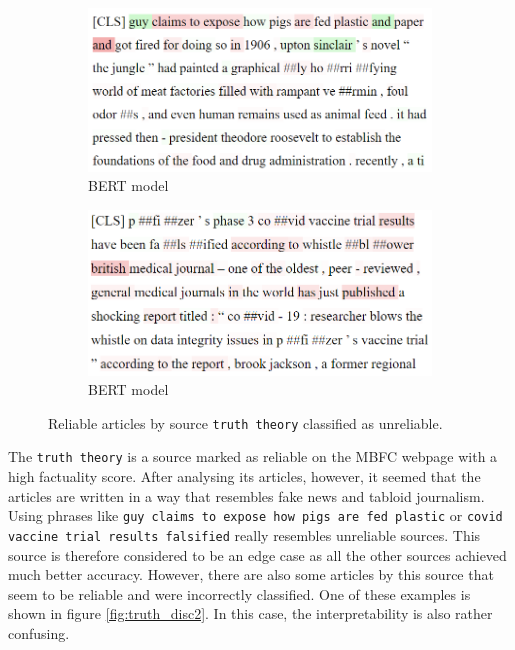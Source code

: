 \begin{figure}[H]
    \centering
    \begin{subfigure}{.5\textwidth}
      \centering
      \includegraphics[width=\linewidth]{obrazky-figures/truth-theory1.png}
      \caption{BERT model}
      \label{fig:truth_disc_1a}
    \end{subfigure}%
    \begin{subfigure}{.5\textwidth}
      \centering
      \includegraphics[width=\linewidth]{obrazky-figures/truth-theory3.png}
      \caption{BERT model}
      \label{fig:truth_disc_1b}
    \end{subfigure}
    \caption{Reliable articles by source \texttt{truth theory} classified as unreliable.}
    \label{fig:truth_disc1}
\end{figure}

The \texttt{truth theory} is a source marked as reliable on the MBFC webpage with a high factuality score. After analysing its articles, however, it seemed that the articles are written in a way that resembles fake news and tabloid journalism. Using phrases like \texttt{guy claims to expose how pigs are fed plastic} or \texttt{covid vaccine trial results falsified} really resembles unreliable sources. This source is therefore considered to be an edge case as all the other sources achieved much better accuracy. However, there are also some articles by this source that seem to be reliable and were incorrectly classified. One of these examples is shown in figure \ref{fig:truth_disc2}. In this case, the interpretability is also rather confusing.

